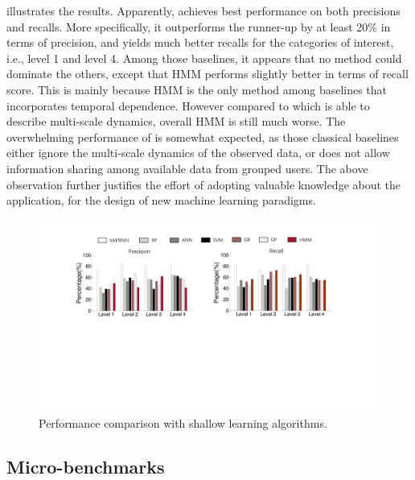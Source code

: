  illustrates the results.
Apparently, \modelname achieves best performance on both precisions and recalls.
More specifically, it outperforms the runner-up by at least 20\% in terms of precision, and yields much better recalls for the categories of interest, i.e., level 1 and level 4. Among those baselines, it appears that no method could dominate the others, except that HMM performs slightly better in terms of recall score. This is mainly because HMM is the only method among baselines that incorporates temporal dependence. However compared to \modelname which is able to describe multi-scale dynamics, overall HMM is still much worse.  The overwhelming performance of \modelname is somewhat expected, as those classical baselines either ignore the multi-scale dynamics of the observed data, or does not allow information sharing among available data from grouped users. The above observation further justifies the effort of adopting valuable knowledge about the application, for the design of new machine learning paradigms. 
\begin{figure}[h]
  \centering
  \includegraphics[width=0.9\columnwidth]{./img/Model_CMP.pdf}
  \caption{Performance comparison with shallow learning algorithms.}
  \label{fig:cmp_models}
\end{figure}





\subsection{Micro-benchmarks}

